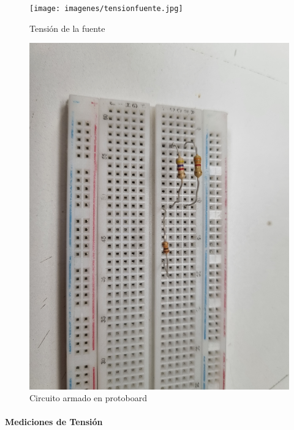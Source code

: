 \documentclass[a4paper,12pt]{article}
\begin{document}
\begin{figure}[H]
    \centering
    \begin{minipage}{0.40\textwidth}
        \centering
        \texttt{[image: imagenes/tensionfuente.jpg]}
        \caption*{Tensión de la fuente}
    \end{minipage}
    \hfill
    \begin{minipage}{0.40\textwidth}
        \centering
        \includegraphics[width=\linewidth]{imagenes/proto.jpg}
        \caption*{Circuito armado en protoboard}
    \end{minipage}
\end{figure}

\paragraph{Mediciones de Tensión}
\paragraph{}
\end{document}
